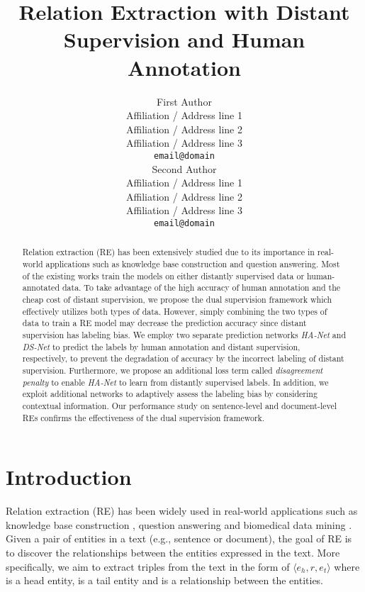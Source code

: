 \documentclass[11pt]{article}
\title{Relation Extraction with Distant Supervision and Human Annotation}
\author{First Author \\
  Affiliation / Address line 1 \\
  Affiliation / Address line 2 \\
  Affiliation / Address line 3 \\
  {\tt email@domain} \\\And
  Second Author \\
  Affiliation / Address line 1 \\
  Affiliation / Address line 2 \\
  Affiliation / Address line 3 \\
  {\tt email@domain} \\}
\date{}
\newcommand{\triple}[3]{\ensuremath{\langle #1,#2,#3\rangle}}
\newcommand{\hanet}{\emph{HA-Net}\xspace}
\newcommand{\dsnet}{\emph{DS-Net}\xspace}
\newcommand{\head}{\xspace}
\newcommand{\tail}{\xspace}
\newcommand{\ehead}{e_{h}}
\newcommand{\etail}{e_{t}}
\begin{document}
\maketitle
\begin{abstract}





Relation extraction (RE) has been extensively studied due to its importance in real-world applications such as knowledge base construction and question answering.
Most of the existing works train the models on either distantly supervised data or human-annotated data.
To take advantage of the high accuracy of human annotation and the cheap cost of distant supervision, we propose the dual supervision framework which effectively utilizes both types of data.
However, simply combining the two types of data to train a RE model may decrease the prediction accuracy since distant supervision has labeling bias.
We employ two separate prediction networks \hanet and \dsnet to predict the labels by human annotation and distant supervision, respectively, to prevent the degradation of accuracy by the incorrect labeling of distant supervision.
Furthermore, we propose an additional loss term called \emph{disagreement penalty}
to enable \hanet to learn from distantly supervised labels.
In addition, we exploit additional networks to adaptively assess the labeling bias by considering contextual information.
Our performance study on sentence-level and document-level REs confirms the effectiveness of the dual supervision framework.







\end{abstract} 

\section{Introduction}
\label{sec:intro}
Relation extraction (RE) has been widely used in real-world applications such as knowledge base construction \cite{dong2014knowledge,KnowledgeFusion,JungKS19}, question answering \cite{xu2016question} and biomedical data mining \cite{ahmed2019bio}.
Given a pair of entities in a text (e.g., sentence or document), the goal of RE is to discover the relationships between the entities expressed in the text.
More specifically, we aim to extract triples from the text in the form of \triple{\ehead}{r}{\etail} where \head is a head entity, \tail is a tail entity and  is a relationship between the entities.
\end{document}
